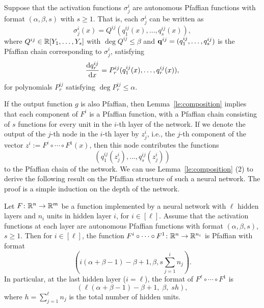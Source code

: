 Suppose that the activation functions $\sigma^i_j$ are autonomous Pfaffian functions with format $(\alpha, \beta, s)$ with $s\geq 1$.
That is, each $\sigma^i_j$ can be written as
\begin{equation*}
\sigma^i_j(x) = Q^{ij}(q_1^{ij}(x), \dotsc, q^{ij}_{s}(x)),
\end{equation*}
where $Q^{ij}\in \mathbb{R}[Y_1,\dots,Y_{s}]$ with $\deg Q^{ij}\leq \beta$ and $\mathbf{q}^{ij} = (q_1^{ij}, \dotsc, q^{ij}_{s})$ is the Pfaffian chain corresponding to $\sigma^i_j$, satisfying
\begin{equation*}
\frac{\mathrm{d}{q_r^{ij}}}{\mathrm{d}{x}} = P_r^{ij} (q_1^{ij}(x), \dotsc, q_r^{ij}(x)),
\end{equation*}
for polynomials $P_r^{ij}$ satisfying $\deg P_r^{ij} \le \alpha$.

If the output function $g$ is also Pfaffian, then Lemma~\ref{le:composition} implies that each component of $F^i$ is a Pfaffian function, with a Pfaffian chain consisting of $s$ functions for every unit in the $i$-th layer of the network. If we denote the output of the $j$-th node in the $i$-th layer by $z^i_j$, i.e., the $j$-th component of the vector $z^i := F^i\circ \cdots \circ F^1(x)$, then this node
contributes the functions
\begin{equation*}
  (q_1^{ij}(z^i_j),\dots,q_s^{ij}(z^i_j))
\end{equation*}
to the Pfaffian chain of the network. We can use Lemma~\ref{le:composition} (2) to derive the following result on the Pfaffian structure of such a neural network. The proof is a simple induction on the depth of the network.

\begin{proposition}\label{prop:nn-format}
Let $F\colon\mathbb{R}^n\to \mathbb{R}^m$ be a function implemented by a neural network with $\ell$ hidden layers and $n_i$ units in hidden layer $i$, for $i\in [\ell]$. Assume that the activation functions at each layer are autonomous Pfaffian functions with format $(\alpha,\beta,s)$, $s\geq 1$. Then for $i\in [\ell]$, the function $F^i\circ \cdots \circ F^1\colon \mathbb{R}^n\to \mathbb{R}^{n_i}$ is Pfaffian with format
\begin{equation*}
  \left(i(\alpha+\beta-1) -\beta+1 , \beta, s\sum_{j=1}^i n_j\right).
\end{equation*}
In particular, at the last hidden layer ($i=\ell$), the format of $F^\ell\circ \cdots \circ F^1$ is
\begin{equation*}
  \left(\ell(\alpha+\beta-1)-\beta+1,\; \beta,\; sh\right),
\end{equation*}
where $h=\sum_{j=1}^\ell n_j$ is the total number of hidden units. 
\end{proposition}

